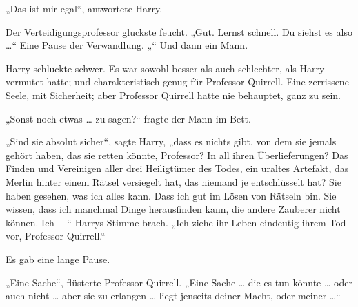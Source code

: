 „Das ist mir egal“, antwortete Harry.

Der Verteidigungsprofessor gluckste feucht.
„Gut. Lernst schnell. Du siehst es also …“ Eine Pause der Verwandlung. „“ Und dann ein Mann.

Harry schluckte schwer. Es war sowohl besser als auch schlechter, als Harry vermutet hatte; und charakteristisch genug für Professor Quirrell. Eine zerrissene Seele, mit Sicherheit; aber Professor Quirrell hatte nie behauptet, ganz zu sein.

„Sonst noch etwas … zu sagen?“ fragte der Mann im Bett.

„Sind sie absolut sicher“, sagte Harry, „dass es nichts gibt, von dem sie jemals gehört haben, das sie retten könnte, Professor? In all ihren Überlieferungen? Das Finden und Vereinigen aller drei Heiligtümer des Todes, ein uraltes Artefakt, das Merlin hinter einem Rätsel versiegelt hat, das niemand je entschlüsselt hat? Sie haben gesehen, was ich alles kann. Dass ich gut im Lösen von Rätseln bin. Sie wissen, dass ich manchmal Dinge herausfinden kann, die andere Zauberer nicht können. Ich —“
Harrys Stimme brach.
„Ich ziehe ihr Leben eindeutig ihrem Tod vor, Professor Quirrell.“

Es gab eine lange Pause.

„Eine Sache“, flüsterte Professor Quirrell.
„Eine Sache … die es tun könnte … oder auch nicht … aber sie zu erlangen … liegt jenseits deiner Macht, oder meiner …“

